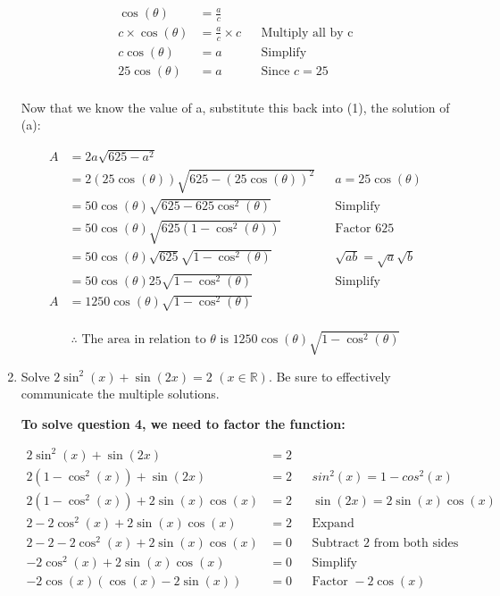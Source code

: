 \documentclass[12pt]{book}
\begin{document}
\begin{enumerate}
\begin{align*}
    \cos(\theta) &= \frac{a}{c} \\
    c \times \cos(\theta) &= \frac{a}{c} \times c && \text{Multiply all by c}\\
    c\cos(\theta) &= a && \text{Simplify}\\
    25\cos(\theta) &= a && \text{Since } c = 25\\
\end{align*}

\newpage

\begin{center}
    Now that we know the value of a, substitute this back into (1), the solution of (a):
\end{center}
\vspace{-0.5cm}

\begin{align*}
    A &= 2a\sqrt{625 - a^2} \\
    &= 2(25\cos(\theta))\sqrt{625 - (25\cos(\theta))^2} && a=25\cos(\theta)\\
    &= 50\cos(\theta)\sqrt{625 - 625\cos^2(\theta)} && \text{Simplify}\\
    &= 50\cos(\theta)\sqrt{625(1 - \cos^2(\theta))} && \text{Factor 625}\\
    &= 50\cos(\theta)\sqrt{625} \sqrt{1 - \cos^2(\theta)} && \sqrt{ab} = \sqrt{a}\sqrt{b}\\ %
    &= 50\cos(\theta)25 \sqrt{1 - \cos^2(\theta)} && \text{Simplify} \\
    A &= 1250\cos(\theta)\sqrt{1 - \cos^2(\theta)} \\
\end{align*}

\vspace{-0.5cm}
$$\boxed{\therefore \text{ The area in relation to } \theta \text{ is } 1250\cos(\theta)\sqrt{1 - \cos^2(\theta)}}$$

\newpage


\item Solve $2\sin^2(x) + \sin(2x) = 2$ $(x \in \mathbb{R})$. Be sure to effectively communicate the multiple solutions.

\textbf{To solve question 4, we need to factor the function:}

\begin{align*}
    2\sin^2(x) + \sin(2x) &= 2 \\
    2(1-\cos^2(x)) + \sin(2x) &= 2 && sin^2(x) = 1 - cos^2(x) \\
    2(1-\cos^2(x)) + 2\sin(x)\cos(x) &= 2 && \sin(2x) = 2\sin(x)\cos(x) \\
    2-2\cos^2(x) + 2\sin(x)\cos(x) &= 2 && \text{Expand}\\
    2 - 2 - 2\cos^2(x) + 2\sin(x)\cos(x) &= 0 && \text{Subtract 2 from both sides}\\
    - 2\cos^2(x) + 2\sin(x)\cos(x) &= 0 && \text{Simplify}\\
    - 2\cos(x)(\cos(x) - 2\sin(x)) &= 0 && \text{Factor } -2\cos(x)\\
\end{align*}


\end{enumerate}
\end{document}
